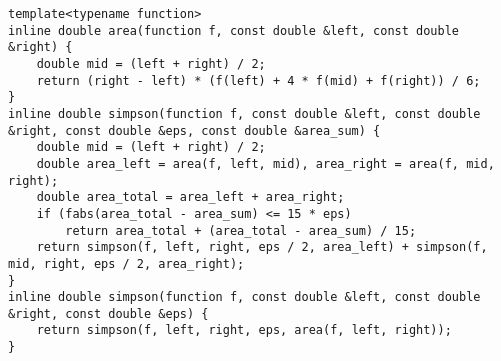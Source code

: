 \begin{lstlisting}
template<typename function>
inline double area(function f, const double &left, const double &right) {
	double mid = (left + right) / 2;
	return (right - left) * (f(left) + 4 * f(mid) + f(right)) / 6;
}
inline double simpson(function f, const double &left, const double &right, const double &eps, const double &area_sum) {
	double mid = (left + right) / 2;
	double area_left = area(f, left, mid), area_right = area(f, mid, right);
	double area_total = area_left + area_right;
	if (fabs(area_total - area_sum) <= 15 * eps)
		return area_total + (area_total - area_sum) / 15;
	return simpson(f, left, right, eps / 2, area_left) + simpson(f, mid, right, eps / 2, area_right);
}
inline double simpson(function f, const double &left, const double &right, const double &eps) {
	return simpson(f, left, right, eps, area(f, left, right));
}
\end{lstlisting}